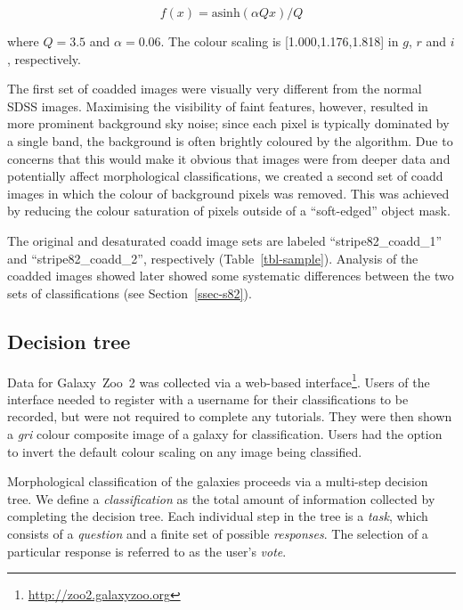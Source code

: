 \documentclass[useAMS,usenatbib]{mn2e}
\begin{document}
\begin{equation}
f(x)=\text{asinh}(\alpha Q x)/Q
\label{eqn-imagegen}
\end{equation}

\noindent where $Q=3.5$ and $\alpha=0.06$. The colour scaling is [1.000,1.176,1.818] in $g$, $r$ and $i$, respectively. 

The first set of coadded images were visually very different from the normal SDSS images. Maximising the visibility of faint features, however, resulted in more prominent background sky noise; since each pixel is typically dominated by a single band, the background is often brightly coloured by the \citet{lup04} algorithm. Due to concerns that this would make it obvious that images were from deeper data and potentially affect morphological classifications, we created a second set of coadd images in which the colour of background pixels was removed. This was achieved by reducing the colour saturation of pixels outside of a ``soft-edged'' object mask. 

The original and desaturated coadd image sets are labeled ``stripe82\_coadd\_1'' and ``stripe82\_coadd\_2'', respectively (Table~\ref{tbl-sample}). Analysis of the coadded images showed later showed some systematic differences between the two sets of classifications (see Section~\ref{ssec-s82}). 


\subsection{Decision tree}\label{ssec-decision_tree}

Data for Galaxy~Zoo~2 was collected via a web-based interface\footnote{\url{http://zoo2.galaxyzoo.org}}. Users of the interface needed to register with a username for their classifications to be recorded, but were not required to complete any tutorials. They were then shown a {\it gri} colour composite image of a galaxy for classification. Users had the option to invert the default colour scaling on any image being classified. 

Morphological classification of the galaxies proceeds via a multi-step decision tree. We define a {\it classification} as the total amount of information collected by completing the decision tree. Each individual step in the tree is a {\it task}, which consists of a {\it question} and a finite set of possible {\it responses}. The selection of a particular response is referred to as the user's {\it vote}. 
\end{document}
